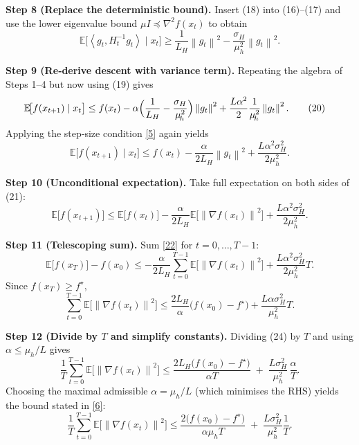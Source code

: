 \documentclass{article}
\newcommand{\E}{\mathbb{E}}
\newcommand{\norm}[1]{\left\|#1\right\|}
\newcommand{\inner}[1]{\left\langle #1 \right\rangle}
\begin{document}
\noindent\textbf{Step 8 (Replace the deterministic bound).}  
Insert (18) into (16)–(17) and use the lower eigenvalue bound $\mu I\preceq \nabla^{2}f(x_t)$ to obtain
\[
\E\bigl[\inner{g_t, H_t^{-1}g_t}\mid x_t\bigr]
\ge \frac{1}{L_{H}}\norm{g_t}^{2}
   -\frac{\sigma_{H}}{\mu_{\!h}^{2}}\norm{g_t}^{2}. \tag{19}
\]

\noindent\textbf{Step 9 (Re‑derive descent with variance term).}  
Repeating the algebra of Steps 1–4 but now using (19) gives
\begin{align}
\E\!\bigl[f(x_{t+1})\mid x_t\bigr]
&\le f(x_t)
   -\alpha\Bigl(\frac{1}{L_{H}}-\frac{\sigma_{H}}{\mu_{\!h}^{2}}\Bigr)\norm{g_t}^{2}
   +\frac{L\alpha^{2}}{2}\frac{1}{\mu_{\!h}^{2}}\norm{g_t}^{2}. \tag{20}
\end{align}
Applying the step‑size condition \eqref{5} again yields
\[
\E\!\bigl[f(x_{t+1})\mid x_t\bigr]
\le f(x_t)-\frac{\alpha}{2L_{H}}\norm{g_t}^{2}
      +\frac{L\alpha^{2}\sigma_{H}^{2}}{2\mu_{\!h}^{2}}. \tag{21}
\]

\noindent\textbf{Step 10 (Unconditional expectation).}  
Take full expectation on both sides of (21):
\[
\E\bigl[f(x_{t+1})\bigr]
\le \E\bigl[f(x_t)\bigr]
      -\frac{\alpha}{2L_{H}}\E\!\bigl[\norm{\nabla f(x_t)}^{2}\bigr]
      +\frac{L\alpha^{2}\sigma_{H}^{2}}{2\mu_{\!h}^{2}}. \tag{22}
\]

\noindent\textbf{Step 11 (Telescoping sum).}  
Sum \eqref{22} for $t=0,\dots,T-1$:
\[
\E\bigl[f(x_T)\bigr]-f(x_0)
\le -\frac{\alpha}{2L_{H}}\sum_{t=0}^{T-1}\E\!\bigl[\norm{\nabla f(x_t)}^{2}\bigr]
   +\frac{L\alpha^{2}\sigma_{H}^{2}}{2\mu_{\!h}^{2}}T. \tag{23}
\]
Since $f(x_T)\ge f^{\star}$,
\[
\sum_{t=0}^{T-1}\E\!\bigl[\norm{\nabla f(x_t)}^{2}\bigr]
\le \frac{2L_{H}}{\alpha}\bigl(f(x_0)-f^{\star}\bigr)
   +\frac{L\alpha\sigma_{H}^{2}}{\mu_{\!h}^{2}}T. \tag{24}
\]

\noindent\textbf{Step 12 (Divide by $T$ and simplify constants).}  
Dividing (24) by $T$ and using $\alpha\le \mu_{\!h}/L$ gives
\[
\frac{1}{T}\sum_{t=0}^{T-1}\E\!\bigl[\norm{\nabla f(x_t)}^{2}\bigr]
\le
\frac{2L_{H}\bigl(f(x_0)-f^{\star}\bigr)}{\alpha T}
\;+\;
\frac{L\sigma_{H}^{2}}{\mu_{\!h}^{2}}\,\frac{\alpha}{T}. \tag{25}
\]
Choosing the maximal admissible $\alpha=\mu_{\!h}/L$ (which minimises the RHS) yields the bound stated in \eqref{6}:
\[
\frac{1}{T}\sum_{t=0}^{T-1}\E\!\bigl[\norm{\nabla f(x_t)}^{2}\bigr]
\le
\frac{2\bigl(f(x_0)-f^{\star}\bigr)}{\alpha\mu_{\!h}T}
\;+\;
\frac{L\sigma_{H}^{2}}{\mu_{\!h}^{2}}\frac{1}{T}.
\tag{26}
\]
\hfill\qedsymbol
\end{document}
